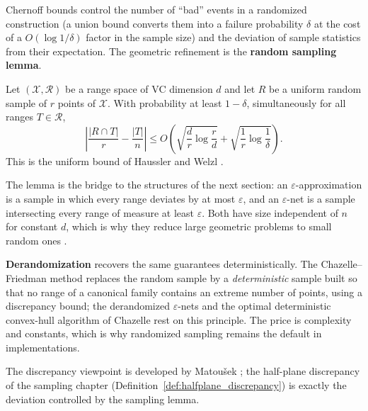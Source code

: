 Chernoff bounds control the number of ``bad'' events in a randomized
construction (a union bound converts them into a failure probability $\delta$
at the cost of a $O(\log 1/\delta)$ factor in the sample size) and the
deviation of sample statistics from their expectation. The geometric refinement
is the \textbf{random sampling lemma}.

\begin{theorem}\label{thm:rand_sampling_lemma}
  Let $(\mathcal{X}, \mathcal{R})$ be a range space of VC dimension $d$ and let
  $R$ be a uniform random sample of $r$ points of $\mathcal{X}$. With
  probability at least $1 - \delta$, simultaneously for all ranges $T \in
  \mathcal{R}$,
  \[
    \left| \frac{|R \cap T|}{r} - \frac{|T|}{n} \right| \le
    O\!\left( \sqrt{\frac{d}{r}\log\frac{r}{d}} +
    \sqrt{\frac{1}{r}\log\frac{1}{\delta}} \right).
  \]
  This is the uniform bound of Haussler and Welzl \cite{hausslerwelzl1987}.
\end{theorem}

The lemma is the bridge to the structures of the next section: an
$\varepsilon$-approximation is a sample in which every range deviates by at
most $\varepsilon$, and an $\varepsilon$-net is a sample intersecting every
range of measure at least $\varepsilon$. Both have size independent of $n$ for
constant $d$, which is why they reduce large geometric problems to small random
ones \cite{harpeled2011}.

\textbf{Derandomization} recovers the same guarantees
deterministically. The Chazelle--Friedman method \cite{chazellefriedman1990}
replaces the random sample by a \emph{deterministic} sample built so that no
range of a canonical family contains an extreme number of points, using a
discrepancy bound; the derandomized $\varepsilon$-nets and the optimal
deterministic convex-hull algorithm of Chazelle \cite{chazelle1993} rest on
this principle. The price is complexity and constants, which is why randomized
sampling remains the default in implementations.

\begin{remark}
  The discrepancy viewpoint is developed by Matou\v{s}ek \cite{matousek1999};
  the half-plane discrepancy of the sampling chapter
  (Definition~\ref{def:halfplane_discrepancy}) is exactly the deviation
  controlled by the sampling lemma.
\end{remark}


